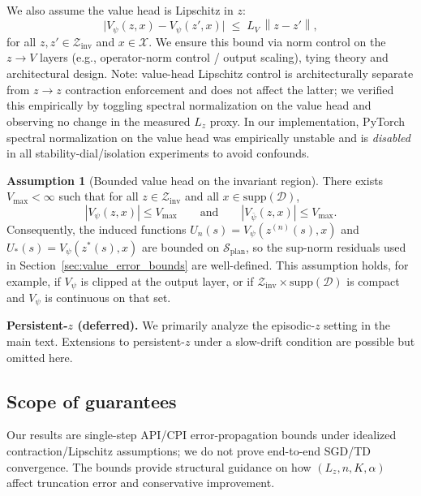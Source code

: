 \documentclass{article}
\theoremstyle{plain}
\theoremstyle{definition}
\newtheorem{assumption}[theorem]{Assumption}
\theoremstyle{remark}
\newcommand{\XX}{\mathcal{X}}
\newcommand{\SSS}{\mathcal{S}}
\newcommand{\norm}[1]{\left\lVert #1 \right\rVert}
\begin{document}
{We also assume the value head is Lipschitz in $z$:
\begin{equation}
\bigl|V_\psi(z,x)-V_\psi(z',x)\bigr|
\;\le\;
L_V\,\norm{z-z'},
\label{eq:LV_def}
\end{equation}
for all $z,z'\in\mathcal{Z}_{\mathrm{inv}}$ and $x\in\XX$.
We ensure this bound via norm control on the $z \to V$ layers (e.g., operator-norm control / output scaling), tying theory and architectural design.
Note: value-head Lipschitz control is architecturally separate from $z\!\to\!z$ contraction enforcement and does not affect the latter; we verified this empirically by toggling spectral normalization on the value head and observing no change in the measured $\hat L_z$ proxy.
In our implementation, PyTorch spectral normalization on the value head was empirically unstable and is \emph{disabled} in all stability-dial/isolation experiments to avoid confounds.
\begin{assumption}[Bounded value head on the invariant region]
\label{ass:bounded_value_head}
There exists $V_{\max}<\infty$ such that for all $z\in\mathcal{Z}_{\mathrm{inv}}$ and all
$x \in \mathrm{supp}(\mathcal{D})$,
\[
|V_\psi(z,x)| \le V_{\max}
\qquad\text{and}\qquad
|V_{\bar\psi}(z,x)| \le V_{\max}.
\]
Consequently, the induced functions $U_n(s)=V_\psi(z^{(n)}(s),x)$ and
$U_*(s)=V_\psi(z^*(s),x)$ are bounded on $\SSS_{\mathrm{plan}}$,
so the sup-norm residuals used in Section~\ref{sec:value_error_bounds} are well-defined.
This assumption holds, for example, if $V_\psi$ is clipped at the output layer, or if
$\mathcal{Z}_{\mathrm{inv}}\times \mathrm{supp}(\mathcal{D})$ is compact and $V_\psi$ is continuous on that set.
\end{assumption}

\textbf{Persistent-$z$ (deferred).}
We primarily analyze the episodic-$z$ setting in the main text.
Extensions to persistent-$z$ under a slow-drift condition are possible but omitted here.
}%

\subsection{Scope of guarantees}
\label{sec:scope}

Our results are single-step API/CPI error-propagation bounds under idealized contraction/Lipschitz assumptions; we do not prove end-to-end SGD/TD convergence. The bounds provide structural guidance on how $(L_z,n,K,\alpha)$ affect truncation error and conservative improvement.
\end{document}
